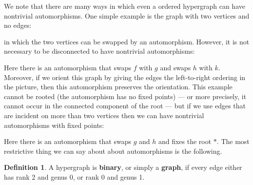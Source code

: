 \documentclass{article}
\theoremstyle{definition}
\newtheorem{defn}[thm]{Definition}
\theoremstyle{remark}
\def\genus{\mathsf{genus}}
\def\rank{\mathsf{rank}}
\begin{document}
We note that there are many ways in which even a ordered hypergraph can have nontrivial automorphisms.
One simple example is the graph with two vertices and no edges:
\begin{center}
\end{center}
in which the two vertices can be swapped by an automorphism.
However, it is not necessary to be disconnected to have nontrivial automorphisms:
\begin{center}
\end{center}
Here there is an automorphism that swaps $f$ with $g$ and swaps $h$ with $k$.
Moreover, if we orient this graph by giving the edges the left-to-right ordering in the picture, then this automorphism preserves the orientation.
This example cannot be rooted (the automorphism has no fixed points) --- or more precisely, it cannot occur in the connected component of the root --- but if we use edges that are incident on more than two vertices then we can have nontrivial automorphisms with fixed points:
\begin{center}
\end{center}
Here there is an automorphism that swaps $g$ and $h$ and fixes the root $\ast$.
The most restrictive thing we can say about about automorphisms is the following.

\begin{defn}
  A hypergraph is \textbf{binary}, or simply a \textbf{graph}, if %
  every edge either has rank 2 and genus 0, or rank 0 and genus 1.
\end{defn}
\end{document}

